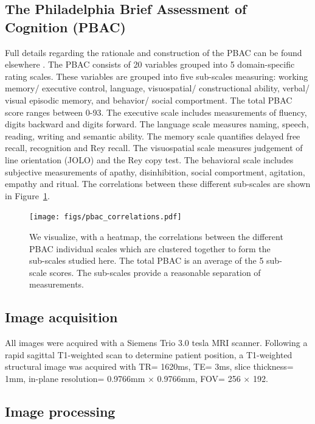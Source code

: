 \documentclass[preprint,authoryear,12pt]{elsarticle}
\begin{document}


\subsection{The Philadelphia Brief Assessment of Cognition (PBAC)} Full details regarding the rationale and construction of the PBAC can be found elsewhere \citet{libon_philadelphia_2011}.  The PBAC consists of 20 variables grouped into 5 domain-specific rating scales.  These variables are grouped into five sub-scales measuring: working memory/ executive control, language, visuospatial/ constructional ability, verbal/ visual episodic memory, and behavior/ social comportment.  The total PBAC score ranges between 0-93. 
The executive scale includes measurements of fluency, digits backward and digits forward.  The language scale measures naming, speech, reading, writing and semantic ability.  The memory scale quantifies delayed free recall, recognition and Rey recall.  The visuospatial scale measures judgement of line orientation (JOLO) and the Rey copy test.  The behavioral scale includes subjective measurements of apathy, disinhibition, social comportment, agitation, empathy and ritual.   The correlations between these different sub-scales are shown in Figure~\ref{fig:pbaccor}.  

\begin{figure}[th] \centering
\texttt{[image: figs/pbac\_correlations.pdf]}
\caption{We visualize, with a heatmap, the correlations between the different PBAC individual scales which are clustered together to form the sub-scales studied here.  The total PBAC is an average of the 5 sub-scale scores.  The sub-scales provide a reasonable separation of measurements.}
\label{fig:pbaccor}
\end{figure}

\subsection{Image acquisition}  All images were acquired with a Siemens Trio 3.0 tesla MRI scanner.  Following a rapid sagittal T1-weighted scan to determine patient position, a T1-weighted structural image was acquired with TR= 1620ms, TE= 3ms, slice thickness= 1mm, in-plane resolution= 0.9766mm $\times$  0.9766mm, FOV= 256 $\times$ 192. 

\subsection{Image processing} 
\end{document}
